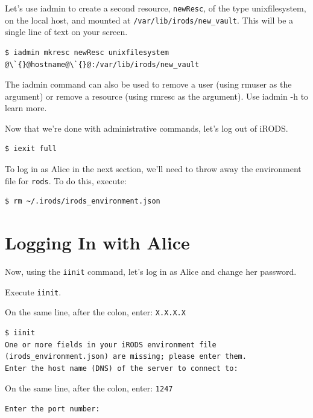 \documentclass[10pt,oneside]{memoir}
\begin{document}
Let's use iadmin to create a second resource, \texttt{newResc}, of the type unixfilesystem, on the local host, and mounted at \texttt{/var/lib/irods/new\_vault}. This will be a single line of text on your screen.

\begin{lstlisting}[basicstyle=\scriptsize\ttfamily]
$ iadmin mkresc newResc unixfilesystem @\`{}@hostname@\`{}@:/var/lib/irods/new_vault
\end{lstlisting}

The iadmin command can also be used to remove a user (using rmuser as the argument) or remove a resource (using rmresc as the argument). Use iadmin -h to learn more.

Now that we're done with administrative commands, let's log out of iRODS.

\begin{lstlisting}
$ iexit full
\end{lstlisting}

To log in as Alice in the next section, we'll need to throw away the environment file for \texttt{rods}. To do this, execute:

\begin{lstlisting}
$ rm ~/.irods/irods_environment.json
\end{lstlisting}

\section{Logging In with Alice}
\label{sec:logging_in_with_alice}

Now, using the \texttt{iinit} command, let's log in as Alice and change her password.

Execute \texttt{iinit}.

On the same line, after the colon, enter: \texttt{X.X.X.X}

\begin{lstlisting}[basicstyle=\scriptsize\ttfamily]
$ iinit
One or more fields in your iRODS environment file (irods_environment.json) are missing; please enter them.
Enter the host name (DNS) of the server to connect to:
\end{lstlisting}

On the same line, after the colon, enter: \texttt{1247}

\begin{lstlisting}[basicstyle=\scriptsize\ttfamily]
Enter the port number:
\end{lstlisting}
\end{document}
